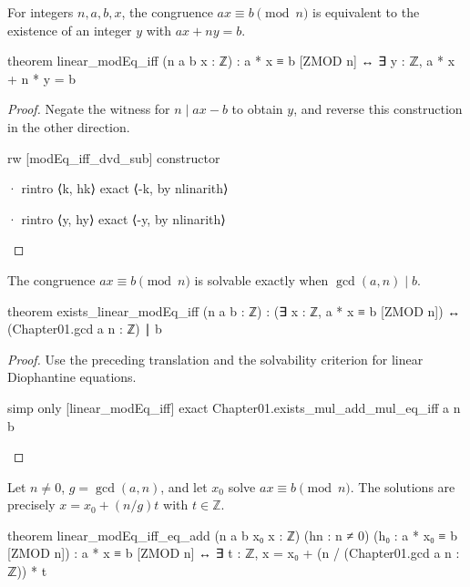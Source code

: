 \begin{theorem}
  \label{ent:thm:linear-modeq-iff}
  For integers $n,a,b,x$, the congruence $ax\equiv b\pmod n$ is equivalent to the existence of an
  integer $y$ with $ax+ny=b$.

  \begin{lean}
    theorem linear_modEq_iff (n a b x : ℤ) :
        a * x ≡ b [ZMOD n] ↔ ∃ y : ℤ, a * x + n * y = b
  \end{lean}
\end{theorem}

\begin{proof}
  Negate the witness for $n\mid ax-b$ to obtain $y$, and reverse this construction in the other
  direction.

  \begin{lean}
    rw [modEq_iff_dvd_sub]
    constructor

    · rintro ⟨k, hk⟩
      exact ⟨-k, by nlinarith⟩

    · rintro ⟨y, hy⟩
      exact ⟨-y, by nlinarith⟩
  \end{lean}
\end{proof}

\begin{theorem}
  \label{ent:thm:exists-linear-modeq-iff}
  The congruence $ax\equiv b\pmod n$ is solvable exactly when $\gcd(a,n)\mid b$.

  \begin{lean}
    theorem exists_linear_modEq_iff (n a b : ℤ) :
        (∃ x : ℤ, a * x ≡ b [ZMOD n]) ↔ (Chapter01.gcd a n : ℤ) ∣ b
  \end{lean}
\end{theorem}

\begin{proof}
  Use the preceding translation and the solvability criterion for linear Diophantine equations.

  \begin{lean}
    simp only [linear_modEq_iff]
    exact Chapter01.exists_mul_add_mul_eq_iff a n b
  \end{lean}
\end{proof}

\begin{theorem}
  \label{ent:thm:linear-modeq-iff-eq-add}
  Let $n\ne0$, $g=\gcd(a,n)$, and let $x_0$ solve $ax\equiv b\pmod n$.
  The solutions are precisely $x=x_0+(n/g)t$ with $t\in\mathbb Z$.

  \begin{lean}
    theorem linear_modEq_iff_eq_add (n a b x₀ x : ℤ) (hn : n ≠ 0)
        (h₀ : a * x₀ ≡ b [ZMOD n]) :
        a * x ≡ b [ZMOD n] ↔ ∃ t : ℤ,
          x = x₀ + (n / (Chapter01.gcd a n : ℤ)) * t
  \end{lean}
\end{theorem}

